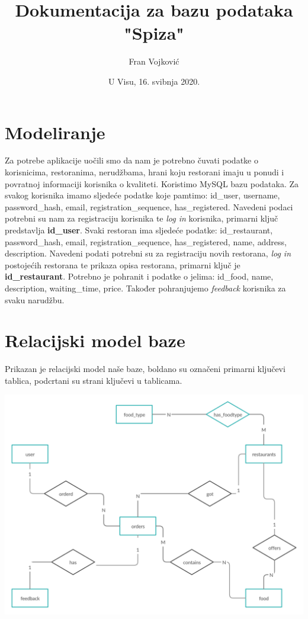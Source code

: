 \documentclass[12pt]{scrartcl}
\begin{document}
\title{Dokumentacija za bazu podataka "Spiza"}
\author{Fran Vojković }
\date{U Visu, 16. svibnja 2020.}
\maketitle
\tableofcontents

\section{Modeliranje}

Za potrebe aplikacije uočili smo da nam je potrebno čuvati podatke o korisnicima, restoranima, nerudžbama, hrani koju restorani imaju u ponudi i povratnoj informaciji korisnika o kvaliteti. Koristimo MySQL bazu podataka. Za svakog korisnika imamo sljedeće podatke koje pamtimo: \textsf{id\_user}, \textsf{username}, \textsf{password\_hash}, \textsf{email}, \textsf{registration\_sequence}, \textsf{has\_registered}. Navedeni podaci potrebni su nam za registraciju korisnika te \textit{log in} korisnika, primarni ključ predstavlja \textbf{\textsf{id\_user}}. Svaki restoran ima sljedeće podatke: \textsf{id\_restaurant}, \textsf{password\_hash}, \textsf{email}, \textsf{registration\_sequence}, \textsf{has\_registered}, \textsf{name}, \textsf{address}, \textsf{description}. Navedeni podati potrebni su za registraciju novih restorana, \textit{log in }postojećih restorana te prikaza opisa restorana, primarni ključ je \textbf{\textsf{id\_restaurant}}. Potrebno je pohranit i podatke o jelima: \textsf{id\_food}, \textsf{name}, \textsf{description}, \textsf{waiting\_time}, \textsf{price}. Također pohranjujemo \textit{feedback} korisnika za svaku narudžbu.

\pagebreak[2]

\section{Relacijski model baze}
Prikazan je relacijski model naše baze, boldano su označeni primarni ključevi tablica, podcrtani su strani ključevi u tablicama.

\includegraphics[width=\textwidth]{slika.png}
\end{document}
